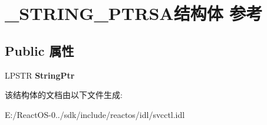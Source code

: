 \hypertarget{struct___s_t_r_i_n_g___p_t_r_s_a}{}\section{\+\_\+\+S\+T\+R\+I\+N\+G\+\_\+\+P\+T\+R\+S\+A结构体 参考}
\label{struct___s_t_r_i_n_g___p_t_r_s_a}
\subsection*{Public 属性}
\begin{DoxyCompactItemize}
\item 
\mbox{\label{struct___s_t_r_i_n_g___p_t_r_s_a_ac464e3f905e7224cd9ac0bb1ef4dc59a}} 
L\+P\+S\+TR {\bfseries String\+Ptr}
\end{DoxyCompactItemize}


该结构体的文档由以下文件生成\+:\begin{DoxyCompactItemize}
\item 
E\+:/\+React\+O\+S-\/0../sdk/include/reactos/idl/svcctl.\+idl\end{DoxyCompactItemize}
